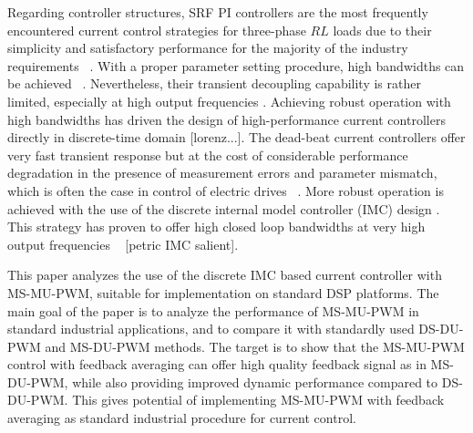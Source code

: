 \documentclass[journal]{IEEEtran}
\begin{document}
Regarding controller structures, SRF PI controllers are the most frequently encountered current control strategies for three-phase $RL$ loads due to their simplicity and satisfactory performance for the majority of the industry requirements ~\cite{rowan1986,bae2003,yepes2014}. With a proper parameter setting procedure, high bandwidths can be achieved ~\cite{yepes2014,holmes2009}. Nevertheless, their transient decoupling capability is rather limited, especially at high output frequencies \cite{lorenz2000}. Achieving robust operation with high bandwidths has driven the design of high-performance current controllers directly in discrete-time domain \cite{bae2003} [lorenz...]. The dead-beat current controllers offer very fast transient response but at the cost of considerable performance degradation in the presence of measurement errors and parameter mismatch, which is often the case in control of electric drives ~\cite{malesani1999,xu2019,rovere2018}. More robust operation is achieved with the use of the discrete internal model controller (IMC) design \cite{lorenz2010}. This strategy has proven to offer high closed loop bandwidths at very high output frequencies ~\cite{commentsHoffmann,vuksa2016} [petric IMC salient].

This paper analyzes the use of the discrete IMC based current controller with MS-MU-PWM, suitable for implementation on standard DSP platforms. The main goal of the paper is to analyze the performance of MS-MU-PWM in standard industrial applications, and to compare it with standardly used DS-DU-PWM and MS-DU-PWM methods. 
The target is to show that the MS-MU-PWM control with feedback averaging can offer high quality feedback signal as in MS-DU-PWM, while also providing improved dynamic performance compared to DS-DU-PWM. This gives potential of implementing MS-MU-PWM with feedback averaging as standard industrial procedure for current control.
\end{document}
